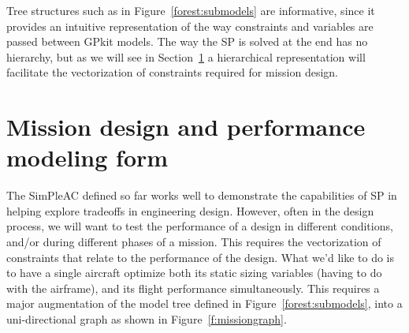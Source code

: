 Tree structures such as in Figure~\ref{forest:submodels} are informative, since
it provides an intuitive representation of the way constraints and variables
are passed between GPkit models. The way the \gls{SP} is solved at the end has no
hierarchy, but as we will see in Section~\ref{s:mission} a hierarchical representation
will facilitate the vectorization of constraints required for mission design.


\section{Mission design and performance modeling form}
\label{s:mission}

The SimPleAC defined so far works well to demonstrate the
capabilities of \gls{SP} in helping explore tradeoffs in engineering design.
However, often in the design process, we will want to test the performance of a
design in different conditions, and/or during different phases of a mission.
This requires the vectorization of
constraints that relate to the performance of the design. What we'd like to do
is to have a single aircraft optimize both its static sizing variables (having
to do with the airframe), and its flight performance simultaneously. This requires a major
augmentation of the model tree defined in Figure~\ref{forest:submodels}, into a
uni-directional graph as shown in Figure~\ref{f:missiongraph}.

